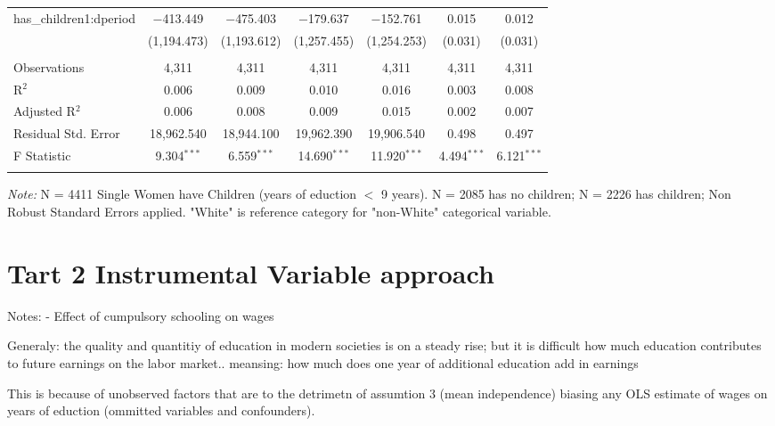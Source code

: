 \documentclass[a4paper]{article}
\begin{document}
\begin{table}[!htbp]
\begin{adjustwidth}{0.cm}{-0cm}
\begin{threeparttable}
\begin{tabular}{@{\extracolsep{-2pt}}lcccccc}
  has\_children1:dperiod & $-$413.449 & $-$475.403 & $-$179.637 & $-$152.761 & 0.015 & 0.012 \\ 
  & (1,194.473) & (1,193.612) & (1,257.455) & (1,254.253) & (0.031) & (0.031) \\ 
 \hline \\[-1.8ex] 
Observations & 4,311 & 4,311 & 4,311 & 4,311 & 4,311 & 4,311 \\ 
R$^{2}$ & 0.006 & 0.009 & 0.010 & 0.016 & 0.003 & 0.008 \\ 
Adjusted R$^{2}$ & 0.006 & 0.008 & 0.009 & 0.015 & 0.002 & 0.007 \\ 
Residual Std. Error & 18,962.540 & 18,944.100  & 19,962.390  & 19,906.540 & 0.498 & 0.497  \\ 
F Statistic & 9.304$^{***}$  & 6.559$^{***}$ & 14.690$^{***}$  & 11.920$^{***}$ & 4.494$^{***}$  & 6.121$^{***}$  \\ 
\hline 
\hline \\[-3.5ex] 
\end{tabular} 
\begin{tablenotes}
      \small
      \item\textit{Note:} N = 4411 Single Women have Children (years of eduction $<$ 9 years). N = 2085 has no children; N = 2226 has children; Non Robust Standard Errors applied. "White" is reference category for "non-White" categorical variable.
    \end{tablenotes}
\end{threeparttable}
\end{adjustwidth}
%
\end{table}




\pagebreak

\section{Tart 2 Instrumental Variable approach}


Notes:
- Effect of cumpulsory schooling on wages

Generaly: the quality and quantitiy of education in modern societies is on a steady rise; but it is difficult how much education contributes to future earnings on the labor market.. meansing: how much does one year of additional education add in earnings

This is because of unobserved factors that are to the detrimetn of assumtion 3 (mean independence) biasing any OLS estimate of wages on years of eduction (ommitted variables and confounders).
\end{document}

